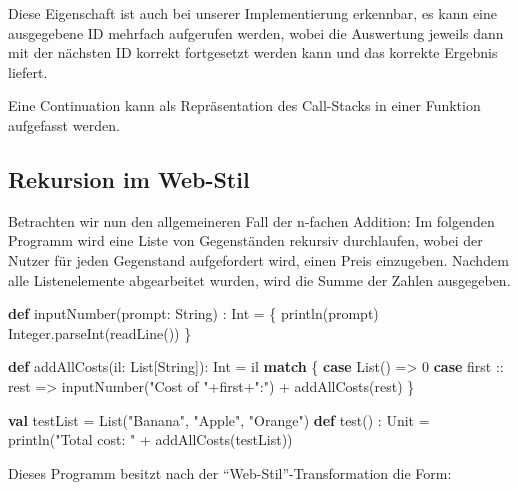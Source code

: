 \documentclass[]{article}
\newenvironment{Shaded}{}{}
\newcommand{\DecValTok}[1]{\textcolor[rgb]{0.25,0.63,0.44}{#1}}
\newcommand{\FunctionTok}[1]{\textcolor[rgb]{0.02,0.16,0.49}{#1}}
\newcommand{\KeywordTok}[1]{\textcolor[rgb]{0.00,0.44,0.13}{\textbf{#1}}}
\newcommand{\NormalTok}[1]{#1}
\newcommand{\StringTok}[1]{\textcolor[rgb]{0.25,0.44,0.63}{#1}}
\begin{document}
Diese Eigenschaft ist auch bei unserer Implementierung erkennbar, es
kann eine ausgegebene ID mehrfach aufgerufen werden, wobei die
Auswertung jeweils dann mit der nächsten ID korrekt fortgesetzt werden
kann und das korrekte Ergebnis liefert.

Eine Continuation kann als Repräsentation des Call-Stacks in einer
Funktion aufgefasst werden.

\hypertarget{rekursion-im-web-stil}{%
\subsection{Rekursion im Web-Stil}\label{rekursion-im-web-stil}}

Betrachten wir nun den allgemeineren Fall der n-fachen Addition: Im
folgenden Programm wird eine Liste von Gegenständen rekursiv
durchlaufen, wobei der Nutzer für jeden Gegenstand aufgefordert wird,
einen Preis einzugeben. Nachdem alle Listenelemente abgearbeitet wurden,
wird die Summe der Zahlen ausgegeben.

\begin{Shaded}
\begin{Highlighting}[]
\KeywordTok{def} \FunctionTok{inputNumber}\NormalTok{(prompt: String) : Int = \{}
  \FunctionTok{println}\NormalTok{(prompt)}
\NormalTok{  Integer.}\FunctionTok{parseInt}\NormalTok{(}\FunctionTok{readLine}\NormalTok{())}
\NormalTok{\}}

\KeywordTok{def} \FunctionTok{addAllCosts}\NormalTok{(il: List[String]): Int = il }\KeywordTok{match}\NormalTok{ \{}
  \KeywordTok{case}\NormalTok{ List() =\textgreater{} }\DecValTok{0}
  \KeywordTok{case}\NormalTok{ first :: rest =\textgreater{} }\FunctionTok{inputNumber}\NormalTok{(}\StringTok{"Cost of "}\NormalTok{+first+}\StringTok{":"}\NormalTok{) + }\FunctionTok{addAllCosts}\NormalTok{(rest)}
\NormalTok{\}}

\KeywordTok{val}\NormalTok{ testList = List(}\StringTok{"Banana"}\NormalTok{, }\StringTok{"Apple"}\NormalTok{, }\StringTok{"Orange"}\NormalTok{)}
\KeywordTok{def} \FunctionTok{test}\NormalTok{() : Unit = }\FunctionTok{println}\NormalTok{(}\StringTok{"Total cost: "}\NormalTok{ + }\FunctionTok{addAllCosts}\NormalTok{(testList))}
\end{Highlighting}
\end{Shaded}

Dieses Programm besitzt nach der ``Web-Stil''-Transformation die Form:
\end{document}
